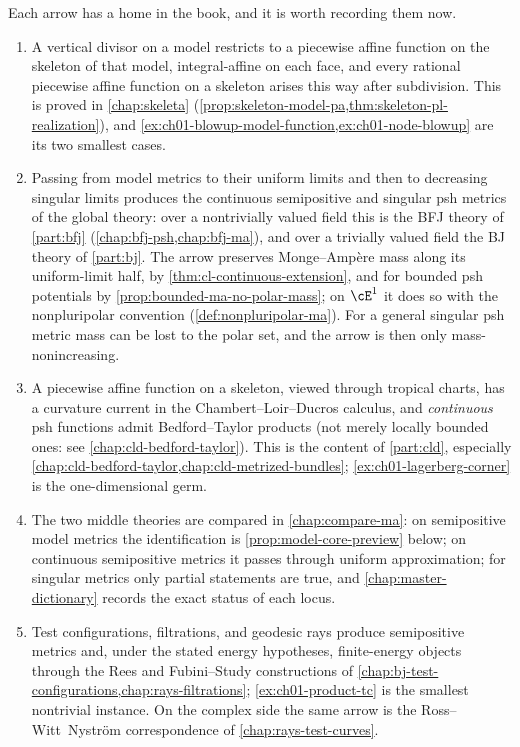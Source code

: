 Each arrow has a home in the book, and it is worth recording them now.

\begin{enumerate}
\item[(A)] A vertical divisor on a model restricts to a piecewise affine
function on the skeleton of that model, integral-affine on each face, and
every rational piecewise affine function on a skeleton arises this way
after subdivision.  This is proved in \cref{chap:skeleta}
(\cref{prop:skeleton-model-pa,thm:skeleton-pl-realization}), and
\cref{ex:ch01-blowup-model-function,ex:ch01-node-blowup} are its two
smallest cases.

\item[(B)] Passing from model metrics to their uniform limits and then to
decreasing singular limits produces the continuous semipositive and
singular psh metrics of the global theory: over a nontrivially valued field
this is the BFJ theory of \cref{part:bfj}
(\cref{chap:bfj-psh,chap:bfj-ma}), and over a trivially valued field the BJ
theory of \cref{part:bj}.  The arrow preserves Monge--Amp\`ere mass along
its uniform-limit half, by \cref{thm:cl-continuous-extension}, and for
bounded psh potentials by \cref{prop:bounded-ma-no-polar-mass}; on
$\cE^1$ it does so with the nonpluripolar convention
(\cref{def:nonpluripolar-ma}).  For a general singular psh metric mass can be
lost to the polar set, and the arrow is then only mass-nonincreasing.

\item[(C)] A piecewise affine function on a skeleton, viewed through
tropical charts, has a curvature current in the Chambert--Loir--Ducros
calculus, and \emph{continuous} psh functions admit Bedford--Taylor products
(not merely locally bounded ones: see \cref{chap:cld-bedford-taylor}).
This is the content of \cref{part:cld}, especially
\cref{chap:cld-bedford-taylor,chap:cld-metrized-bundles};
\cref{ex:ch01-lagerberg-corner} is the one-dimensional germ.

\item[(D)] The two middle theories are compared in
\cref{chap:compare-ma}: on semipositive model metrics the identification
is \cref{prop:model-core-preview} below; on continuous semipositive metrics
it passes through uniform approximation; for singular metrics only partial
statements are true, and \cref{chap:master-dictionary} records the exact
status of each locus.

\item[(E)] Test configurations, filtrations, and geodesic rays produce
semipositive metrics and, under the stated energy hypotheses, finite-energy
objects through the Rees and Fubini--Study constructions of
\cref{chap:bj-test-configurations,chap:rays-filtrations};
\cref{ex:ch01-product-tc} is the smallest nontrivial instance.  On the
complex side the same arrow is the Ross--Witt~Nystr\"om correspondence of
\cref{chap:rays-test-curves}.


\end{enumerate}
